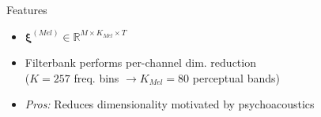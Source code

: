 \documentclass[8pt,hyperref={pdfpagelabels=true},xcolor=table,aspectratio=169]{beamer}
\begin{document}
\begin{frame}{Features}
{\begin{itemize}
              \begin{itemize}
                  \item $\bm{\xi}^{(Mel)} \in \mathbb{R}^{M \times K_{Mel} \times T}$
                  \item Filterbank performs per-channel dim. reduction  \\ ($K=257$ freq. bins $\rightarrow K_{Mel}=80$ perceptual bands)
                  \item \textit{Pros:} Reduces dimensionality motivated by psychoacoustics
              \end{itemize}
    \end{itemize}
    }
\end{frame}
\end{document}
